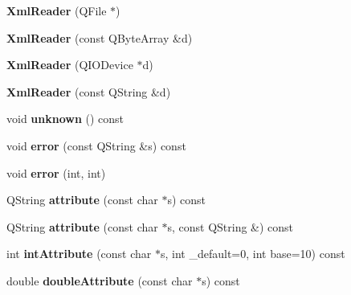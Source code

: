 \begin{DoxyCompactItemize}
\item 
\mbox{\label{class_xml_reader_a4cd151c2f2ced24234522aa86e92fd25}} 
{\bfseries Xml\+Reader} (Q\+File $\ast$)
\item 
\mbox{\label{class_xml_reader_a6623400bd3ce16306449805db5782877}} 
{\bfseries Xml\+Reader} (const Q\+Byte\+Array \&d)
\item 
\mbox{\label{class_xml_reader_ac5b1b578f4865f0ef32f4a8293c0123b}} 
{\bfseries Xml\+Reader} (Q\+I\+O\+Device $\ast$d)
\item 
\mbox{\label{class_xml_reader_ac540aa2e4ffa6ef0a38e890912bc5689}} 
{\bfseries Xml\+Reader} (const Q\+String \&d)
\item 
\mbox{\label{class_xml_reader_a4fdd7a4f8b8530d21540432bf9b1f5a2}} 
void {\bfseries unknown} () const
\item 
\mbox{\label{class_xml_reader_a59ef085e08cae8f5ec43c3bff09a294f}} 
void {\bfseries error} (const Q\+String \&s) const
\item 
\mbox{\label{class_xml_reader_a84b3c714680ad398db5e7ed1a30dfee5}} 
void {\bfseries error} (int, int)
\item 
\mbox{\label{class_xml_reader_a681680c580863f720b347e25effadfcb}} 
Q\+String {\bfseries attribute} (const char $\ast$s) const
\item 
\mbox{\label{class_xml_reader_a282721b1851fc18afde59752fe9a73a4}} 
Q\+String {\bfseries attribute} (const char $\ast$s, const Q\+String \&) const
\item 
\mbox{\label{class_xml_reader_adf24c1903df844d21f0f0f42d3ef4a9d}} 
int {\bfseries int\+Attribute} (const char $\ast$s, int \+\_\+default=0, int base=10) const
\item 
\mbox{\label{class_xml_reader_a737799d74d71716a8550a076ec6d4df0}} 
double {\bfseries double\+Attribute} (const char $\ast$s) const

\end{DoxyCompactItemize}
